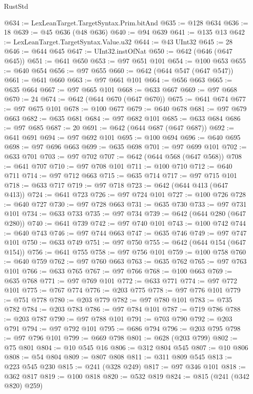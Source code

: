 \begin{lexlean}{RustStd}
\begin{coremodule}
@634 := LexLeanTarget.TargetSyntax.Prim.bitAnd
@635 := @128 @634
@636 := 18
@639 := @45 @636 (@48 @636)
@640 := @94 @639
@641 := @135 @13
@642 := LexLeanTarget.TargetSyntax.Value.u32
@644 := @43 UInt32
@645 := 28
@646 := @644 @645
@647 := UInt32.instOfNat
@650 := @642 (@646 (@647 @645))
@651 := @641 @650
@653 := @97 @651 @101
@654 := @100 @653
@655 := @640 @654
@656 := @97 @655
@660 := @642 (@644 @547 (@647 @547))
@661 := @641 @660
@663 := @97 @661 @101
@664 := @656 @663
@665 := @635 @664
@667 := @97 @665 @101
@668 := @633 @667
@669 := @97 @668
@670 := 24
@674 := @642 (@644 @670 (@647 @670))
@675 := @641 @674
@677 := @97 @675 @101
@678 := @100 @677
@679 := @640 @678
@681 := @97 @679 @663
@682 := @635 @681
@684 := @97 @682 @101
@685 := @633 @684
@686 := @97 @685
@687 := 20
@691 := @642 (@644 @687 (@647 @687))
@692 := @641 @691
@694 := @97 @692 @101
@695 := @100 @694
@696 := @640 @695
@698 := @97 @696 @663
@699 := @635 @698
@701 := @97 @699 @101
@702 := @633 @701
@703 := @97 @702
@707 := @642 (@644 @568 (@647 @568))
@708 := @641 @707
@710 := @97 @708 @101
@711 := @100 @710
@712 := @640 @711
@714 := @97 @712 @663
@715 := @635 @714
@717 := @97 @715 @101
@718 := @633 @717
@719 := @97 @718
@723 := @642 (@644 @413 (@647 @413))
@724 := @641 @723
@726 := @97 @724 @101
@727 := @100 @726
@728 := @640 @727
@730 := @97 @728 @663
@731 := @635 @730
@733 := @97 @731 @101
@734 := @633 @733
@735 := @97 @734
@739 := @642 (@644 @280 (@647 @280))
@740 := @641 @739
@742 := @97 @740 @101
@743 := @100 @742
@744 := @640 @743
@746 := @97 @744 @663
@747 := @635 @746
@749 := @97 @747 @101
@750 := @633 @749
@751 := @97 @750
@755 := @642 (@644 @154 (@647 @154))
@756 := @641 @755
@758 := @97 @756 @101
@759 := @100 @758
@760 := @640 @759
@762 := @97 @760 @663
@763 := @635 @762
@765 := @97 @763 @101
@766 := @633 @765
@767 := @97 @766
@768 := @100 @663
@769 := @635 @768
@771 := @97 @769 @101
@772 := @633 @771
@774 := @97 @772 @101
@775 := @767 @774
@776 := @203 @775
@778 := @97 @776 @101
@779 := @751 @778
@780 := @203 @779
@782 := @97 @780 @101
@783 := @735 @782
@784 := @203 @783
@786 := @97 @784 @101
@787 := @719 @786
@788 := @203 @787
@790 := @97 @788 @101
@791 := @703 @790
@792 := @203 @791
@794 := @97 @792 @101
@795 := @686 @794
@796 := @203 @795
@798 := @97 @796 @101
@799 := @669 @798
@801 := @628 (@203 @799)
@802 := @75 @801
@804 := @10 @545 @16
@806 := @312 @804 @545
@807 := @10 @806
@808 := @54 @804
@809 := @807 @808
@811 := @311 @809 @545
@813 := @223 @545 @230
@815 := @241 (@328 @249)
@817 := @97 @346 @101
@818 := @362 @817
@819 := @100 @818
@820 := @532 @819
@824 := @815 (@241 (@342 @820) @259)

\end{coremodule}
\end{lexlean}
